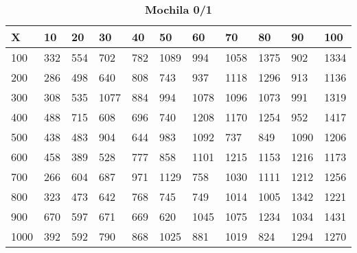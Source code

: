 \documentclass[10pt,letterpaper]{article}
\begin{document}
\newpage 
{}
\begin{center}
\begin{table}\renewcommand{\arraystretch}{2.5}
\caption{\large \textbf{Mochila 0/1}}
\centering
\begin{tabular} { |m{0.5cm}|m{1.3cm}|m{1.3cm}|m{1.3cm}|m{1.3cm}|m{1.3cm}|m{1.3cm}|m{1.3cm}|m{1.3cm}|m{1.3cm}|m{1.3cm}|} 
\hline
\rowcolor{Gray}
\centering \textbf{X} & \centering \textbf{10} & \centering \textbf{20} & \centering \textbf{30}\ & \centering \textbf{40} & \centering \textbf{50} & \centering \textbf{60}\ & \centering \textbf{70} & \centering \textbf{80} & \centering \textbf{90}\ & \textbf{100} \\\hline
\cellcolor{Gray}100 & \Large 332 & \Large 554 & \Large 702 & \Large 782 & \Large 1089 & \Large 994 & \Large 1058 & \Large 1375 & \Large 902 & \Large 1334 \\
\hline
\cellcolor{Gray}200 & \Large 286 & \Large 498 & \Large 640 & \Large 808 & \Large 743 & \Large 937 & \Large 1118 & \Large 1296 & \Large 913 & \Large 1136 \\
\hline
\cellcolor{Gray}300 & \Large 308 & \Large 535 & \Large 1077 & \Large 884 & \Large 994 & \Large 1078 & \Large 1096 & \Large 1073 & \Large 991 & \Large 1319 \\
\hline
\cellcolor{Gray}400 & \Large 488 & \Large 715 & \Large 608 & \Large 696 & \Large 740 & \Large 1208 & \Large 1170 & \Large 1254 & \Large 952 & \Large 1417 \\
\hline
\cellcolor{Gray}500 & \Large 438 & \Large 483 & \Large 904 & \Large 644 & \Large 983 & \Large 1092 & \Large 737 & \Large 849 & \Large 1090 & \Large 1206 \\
\hline
\cellcolor{Gray}600 & \Large 458 & \Large 389 & \Large 528 & \Large 777 & \Large 858 & \Large 1101 & \Large 1215 & \Large 1153 & \Large 1216 & \Large 1173 \\
\hline
\cellcolor{Gray}700 & \Large 266 & \Large 604 & \Large 687 & \Large 971 & \Large 1129 & \Large 758 & \Large 1030 & \Large 1111 & \Large 1212 & \Large 1256 \\
\hline
\cellcolor{Gray}800 & \Large 323 & \Large 473 & \Large 642 & \Large 768 & \Large 745 & \Large 749 & \Large 1014 & \Large 1005 & \Large 1342 & \Large 1221 \\
\hline
\cellcolor{Gray}900 & \Large 670 & \Large 597 & \Large 671 & \Large 669 & \Large 620 & \Large 1045 & \Large 1075 & \Large 1234 & \Large 1034 & \Large 1431 \\
\hline
\cellcolor{Gray}1000 & \Large 392 & \Large 592 & \Large 790 & \Large 868 & \Large 1025 & \Large 881 & \Large 1019 & \Large 824 & \Large 1294 & \Large 1270 \\
\hline
\end{tabular} \\
\end{table}
\end{center}
\end{document}

